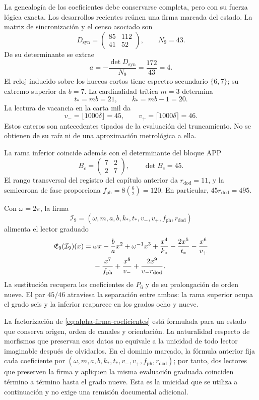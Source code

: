 La genealogía de los coeficientes debe conservarse completa, pero con su
fuerza lógica exacta. Los desarrollos recientes reúnen una firma marcada
del estado. La matriz de sincronización y el censo asociado son
\[
 D_{\mathrm{syn}}=\begin{pmatrix}85&112\\41&52\end{pmatrix},
 \qquad N_9=43.
\]
De su determinante se extrae
\[
 a=-\frac{\det D_{\mathrm{syn}}}{N_9}
   =\frac{172}{43}=4.
\]
El reloj inducido sobre los huecos cortos tiene espectro secundario
\(\{6,7\}\); su extremo superior da \(b=7\). La cardinalidad
trítica \(m=3\) determina
\[
 t_*=mb=21,\qquad k_*=mb-1=20.
\]
La lectura de vacancia en la carta mil da
\[
 v_-=\lfloor1000\delta\rfloor=45,\qquad
 v_+=\lceil1000\delta\rceil=46.
\]
Estos enteros son antecedentes tipados de la evaluación del truncamiento. No se
obtienen de su raíz ni de una aproximación metrológica a ella.

La rama inferior coincide además con el determinante del bloque APP
\[
 B_c=\begin{pmatrix}7&2\\2&7\end{pmatrix},\qquad\det B_c=45.
\]
El rango transversal del registro del capítulo anterior da
\(r_{\mathrm{dod}}=11\), y la semicorona de fase proporciona
\(f_{\mathrm{ph}}=8\binom62=120\). En particular,
\(45r_{\mathrm{dod}}=495\).

Con \(\omega=2\pi\), la firma
\[
 \mathcal I_9=(\omega,m,a,b,k_*,t_*,v_-,v_+,f_{\mathrm{ph}},r_{\mathrm{dod}})
\]
alimenta el lector graduado
\begin{align}
 \mathfrak E_9(\mathcal I_9)(x)
 ={}&\omega x-\frac ba x^2+\omega^{-1}x^3
 +\frac{x^4}{k_*}-\frac{2x^5}{t_*}-\frac{x^6}{v_+}\notag\\
 &-\frac{x^7}{f_{\mathrm{ph}}}+\frac{x^8}{v_-}
 +\frac{2x^9}{v_-r_{\mathrm{dod}}}.
 \label{eq:alpha-firma-coeficientes}
\end{align}
La sustitución recupera los coeficientes de \(P_6\) y de su
prolongación de orden nueve. El par \(45/46\) atraviesa la separación
entre ambos: la rama superior ocupa el grado seis y la inferior reaparece
en los grados ocho y nueve.

La factorización de \eqref{eq:alpha-firma-coeficientes} está formulada
para un estado que conserva origen, orden de canales y orientación. La
naturalidad respecto de morfismos que preservan esos datos no equivale a
la unicidad de todo lector imaginable después de olvidarlos. En el dominio
marcado, la fórmula anterior fija cada coeficiente por
\((\omega,m,a,b,k_*,t_*,v_-,v_+,f_{\mathrm{ph}},r_{\mathrm{dod}})\);
por tanto, dos lectores que preserven la firma y apliquen la misma
evaluación graduada coinciden término a término hasta el grado nueve. Esta
es la unicidad que se utiliza a continuación y no exige una remisión
documental adicional.

